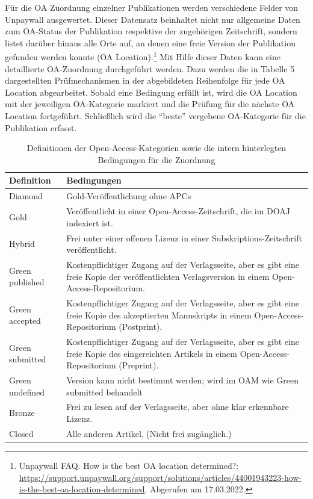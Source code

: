 \documentclass[a4paper,
fontsize=11pt,
oneside,
numbers=noperiodatend,
parskip=half-,
bibliography=totoc,
final
]{scrartcl}
\begin{document}
Für die OA Zuordnung einzelner Publikationen werden verschiedene Felder
von Unpaywall ausgewertet. Dieser Datensatz beinhaltet nicht nur
allgemeine Daten zum OA-Status der Publikation respektive der
zugehörigen Zeitschrift, sondern listet darüber hinaus alle Orte auf, an
denen eine freie Version der Publikation gefunden werden konnte (OA
Location).\footnote{Unpaywall FAQ. How is the best OA location
  determined?:
  \href{https://support.unpaywall.org/support/solutions/articles/44001943223-how-is-the-best-oa-location-determined-}{https://support.unpaywall.org/support/solutions/articles/44001943223-how-is-the-best-oa-location-determined}.
  Abgerufen am 17.03.2022.} Mit Hilfe dieser Daten kann eine
detaillierte OA-Zuordnung durchgeführt werden. Dazu werden die in
Tabelle 5 dargestellten Prüfmechanismen in der abgebildeten Reihenfolge
für jede OA Location abgearbeitet. Sobald eine Bedingung erfüllt ist,
wird die OA Location mit der jeweiligen OA-Kategorie markiert und die
Prüfung für die nächste OA Location fortgeführt. Schließlich wird die
\enquote{beste} vergebene OA-Kategorie für die Publikation erfasst.

\begin{table}[!ht]
    \centering
    \begin{tabular}{lp{10cm}}
    \toprule
        \textbf{Definition} & \textbf{Bedingungen}  \\
        \midrule
Diamond & Gold-Veröffentlichung ohne APCs \\
Gold & Veröffentlicht in einer Open-Access-Zeitschrift, die im DOAJ
indexiert ist. \\
Hybrid & Frei unter einer offenen Lizenz in einer
Subskriptions-Zeitschrift veröffentlicht. \\
Green published & Kostenpflichtiger Zugang auf der Verlagsseite, aber es
gibt eine freie Kopie der veröffentlichten Verlagsversion in einem
Open-Access-Repositorium. \\
Green accepted & Kostenpflichtiger Zugang auf der Verlagsseite, aber es
gibt eine freie Kopie des akzeptierten Manuskripts in einem
Open-Access-Repositorium (Postprint). \\
Green submitted & Kostenpflichtiger Zugang auf der Verlagsseite, aber es
gibt eine freie Kopie des eingereichten Artikels in einem
Open-Access-Repositorium (Preprint). \\
Green undefined & Version kann nicht bestimmt werden; wird im OAM wie
Green submitted behandelt \\
Bronze & Frei zu lesen auf der Verlagsseite, aber ohne klar erkennbare
Lizenz. \\
Closed & Alle anderen Artikel. (Nicht frei zugänglich.) \\
  \bottomrule
\end{tabular}
           \caption{Definitionen der Open-Access-Kategorien sowie die intern hinterlegten Bedingungen für die Zuordnung}
\end{table}
\end{document}
